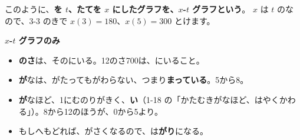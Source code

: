 このように、\textbf{を $t$、たてを $x$ にしたグラフを、$x$-$t$ グラフという}。 $x$ は $t$ のなので、3-3 のきで $x(3)=180$、$x(5)=300$ とけます。

\textbf{$x$-$t$ グラフのみ}
\begin{itemize}[leftmargin=1.6\zw, itemsep=1pt, topsep=2pt, label={\color{\bkTT}●}]
\item \textbf{のさ}は、そのにいる。12のさ700は、にいること。
\item \textbf{が}なは、がたってもがわらない、つまり\textbf{まっている}。5から8。
\item \textbf{が}なほど、1にむのりがきく、\textbf{い}（1-18 の「かたむきがなほど、はやくかわる」）。8から12のほうが、0から5より。
\item もしへもどれば、がさくなるので、は\textbf{がり}になる。
\end{itemize}

